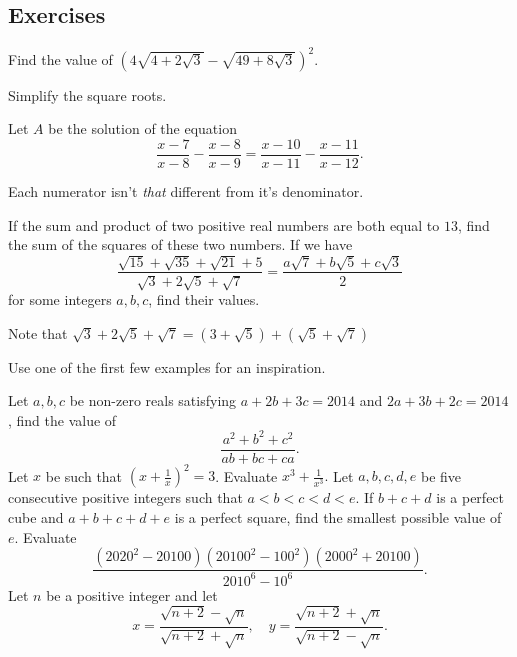 \documentclass[../jarvis.tex]{subfiles}
\begin{document}
\subsection{Exercises}
\problem[2015 SMO(J) P9]Find the value of $\left(4\sqrt{4+2\sqrt{3}}-\sqrt{49+8\sqrt{3}}\right)^2.$
\begin{hints}
    \begin{hint}
        Simplify the square roots.
    \end{hint}
\end{hints}
\problem[2014 SMO(J) P13]Let $A$ be the solution of the equation
$$\frac{x-7}{x-8}-\frac{x-8}{x-9}=\frac{x-10}{x-11}-\frac{x-11}{x-12}.$$
\begin{hints}
    \begin{hint}
        Each numerator isn't \textit{that} different from it's denominator.
    \end{hint}
\end{hints}
\problem[2016 SMO(J) P11]If the sum and product of two positive real numbers are both equal to $13$, find the sum of the squares of these two numbers.
\problem[2022 SMO(J) P22]If we have $$\frac{\sqrt{15}+\sqrt{35}+\sqrt{21}+5}{\sqrt{3}+2\sqrt{5}+\sqrt{7}}=\frac{a\sqrt{7}+b\sqrt{5}+c\sqrt{3}}{2}$$ for some integers $a,b,c$, find their values.
\begin{hints}
    \begin{hint}
        Note that $\sqrt{3}+2\sqrt{5}+\sqrt{7}=(3+\sqrt{5})+(\sqrt{5}+\sqrt{7})$
    \end{hint}
    \begin{hint}
        Use one of the first few examples for an inspiration.
    \end{hint}
\end{hints}
\problem[2014 SMO(J) P23]Let $a,b,c$ be non-zero reals satisfying $a+2b+3c=2014$ and $2a+3b+2c=2014$, find the value of 
$$\frac{a^2+b^2+c^2}{ab+bc+ca}.$$
\problem[2014 SMO(J) P26]Let $x$ be such that $\left(x+\frac{1}{x}\right)^2=3$. Evaluate $x^3+\frac{1}{x^3}.$
\problem[2014/15 SDML 2A/P5]Let $a,b,c,d,e$ be five consecutive positive integers such that $a<b<c<d<e$. If $b+c+d$ is a perfect cube and $a+b+c+d+e$ is a perfect square, find the smallest possible value of $e$.
\problem[2008 SMO(J) P23]Evaluate 
$$\frac{(2020^2-20100)(20100^2-100^2)(2000^2+20100)}{2010^6-10^6}.$$
\problem[2014 SMO(S) P23]Let $n$ be a positive integer and let
$$x=\frac{\sqrt{n+2}-\sqrt{n}}{\sqrt{n+2}+\sqrt{n}},\quad y=\frac{\sqrt{n+2}+\sqrt{n}}{\sqrt{n+2}-\sqrt{n}}.$$
\end{document}
